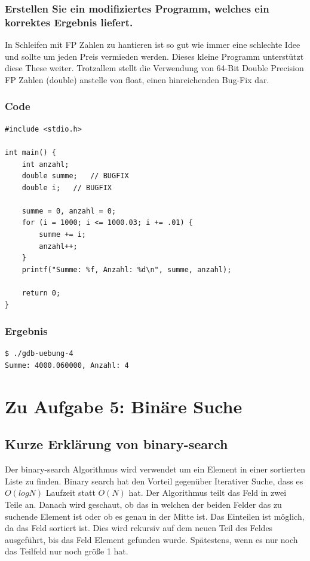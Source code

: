 \documentclass[12pt]{article}
\begin{document}
\subsubsection{Erstellen Sie ein modifiziertes Programm, welches ein korrektes Ergebnis liefert.}
In Schleifen mit FP Zahlen zu hantieren ist so gut wie immer eine schlechte Idee und sollte um jeden Preis vermieden werden. Dieses kleine Programm unterstützt diese These weiter. Trotzallem stellt die Verwendung von 64-Bit Double Precision FP Zahlen (double) anstelle von float, einen hinreichenden Bug-Fix dar.

\newpage
\subsubsection*{Code}
\begin{lstlisting}
#include <stdio.h>

int main() {
	int anzahl;
	double summe;	// BUGFIX
	double i;	// BUGFIX

	summe = 0, anzahl = 0;
	for (i = 1000; i <= 1000.03; i += .01) {
		summe += i;
		anzahl++;
	}
	printf("Summe: %f, Anzahl: %d\n", summe, anzahl);

	return 0;
}
\end{lstlisting}

\subsubsection*{Ergebnis}
\begin{lstlisting}
$ ./gdb-uebung-4
Summe: 4000.060000, Anzahl: 4
\end{lstlisting}


	


\newpage
\section{Zu Aufgabe 5: Binäre Suche}

\subsection{Kurze Erklärung von binary-search}

Der binary-search Algorithmus wird verwendet um ein Element in einer sortierten Liste zu finden.
Binary search hat den Vorteil gegenüber Iterativer Suche, dass es $O(log N)$ Laufzeit statt $O(N)$ hat.
Der Algorithmus teilt das Feld in zwei Teile an. Danach wird geschaut, ob das in welchen der beiden Felder das zu suchende
Element ist oder ob es genau in der Mitte ist. Das Einteilen ist möglich, da das Feld sortiert ist. 
Dies wird rekursiv auf dem neuen Teil des Feldes ausgeführt, bis das Feld Element gefunden wurde. 
Spätestens, wenn es nur noch das Teilfeld nur noch größe 1 hat.
\end{document}
